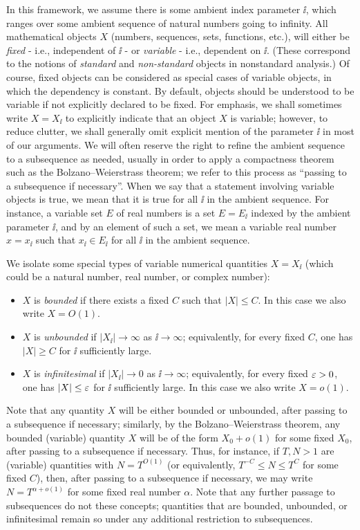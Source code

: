 In this framework, we assume there is some ambient index parameter $\ii$, which ranges over some ambient sequence of natural numbers going to infinity.  All mathematical objects $X$ (numbers, sequences, sets, functions, etc.), will either be \emph{fixed} - i.e., independent of $\ii$ - or \emph{variable} - i.e., dependent on $\ii$.  (These correspond to the notions of \emph{standard} and \emph{non-standard} objects in nonstandard analysis.)  Of course, fixed objects can be considered as special cases of variable objects, in which the dependency is constant.  By default, objects should be understood to be variable if not explicitly declared to be fixed. For emphasis, we shall sometimes write $X = X_{\ii}$ to explicitly indicate that an object $X$ is variable; however, to reduce clutter, we shall generally omit explicit mention of the parameter $\ii$ in most of our arguments. We will often reserve the right to refine the ambient sequence to a subsequence as needed, usually in order to apply a compactness theorem such as the Bolzano--Weierstrass theorem; we refer to this process as ``passing to a subsequence if necessary''.  When we say that a statement involving variable objects is true, we mean that it is true for all $\ii$ in the ambient sequence.
For instance, a variable set $E$ of real numbers is a set $E = E_{\ii}$ indexed by the ambient parameter $\ii$, and by an element of such a set, we mean a variable real number $x = x_{\ii}$ such that $x_{\ii} \in E_{\ii}$ for all $\ii$ in the ambient sequence.

We isolate some special types of variable numerical quantities $X = X_{\ii}$ (which could be a natural number, real number, or complex number):
\begin{itemize}
\item $X$ is \emph{bounded} if there exists a fixed $C$ such that $|X| \leq C$. In this case we also write $X = O(1)$.
\item $X$ is \emph{unbounded} if $|X_{\ii}| \to \infty$ as $\ii \to \infty$; equivalently, for every fixed $C$, one has $|X| \geq C$ for $\ii$ sufficiently large.
\item $X$ is \emph{infinitesimal} if $|X_{\ii}| \to 0$ as $\ii \to \infty$; equivalently, for every fixed $\varepsilon>0$, one has $|X| \leq \varepsilon$ for $\ii$ sufficiently large. In this case we also write $X = o(1)$.
\end{itemize}

Note that any quantity $X$ will be either bounded or unbounded, after passing to a subsequence if necessary; similarly, by the Bolzano--Weierstrass theorem, any bounded (variable) quantity $X$ will be of the form $X_0+o(1)$ for some fixed $X_0$, after passing to a subsequence if necessary.  Thus, for instance, if $T, N > 1$ are (variable) quantities with $N = T^{O(1)}$ (or equivalently, $T^{-C} \leq N \leq T^C$ for some fixed $C$), then, after passing to a subsequence if necessary, we may write $N = T^{\alpha+o(1)}$ for some fixed real number $\alpha$.  Note that any further passage to subsequences do not these concepts; quantities that are bounded, unbounded, or infinitesimal remain so under any additional restriction to subsequences.

